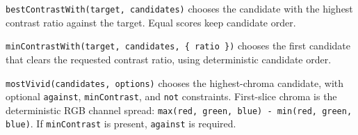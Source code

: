 \texttt{b\allowbreak{}e\allowbreak{}s\allowbreak{}t\allowbreak{}C\allowbreak{}o\allowbreak{}n\allowbreak{}t\allowbreak{}r\allowbreak{}a\allowbreak{}s\allowbreak{}t\allowbreak{}W\allowbreak{}i\allowbreak{}t\allowbreak{}h\allowbreak{}(\allowbreak{}t\allowbreak{}a\allowbreak{}r\allowbreak{}g\allowbreak{}e\allowbreak{}t\allowbreak{},\allowbreak{} \allowbreak{}c\allowbreak{}a\allowbreak{}n\allowbreak{}d\allowbreak{}i\allowbreak{}d\allowbreak{}a\allowbreak{}t\allowbreak{}e\allowbreak{}s\allowbreak{})} chooses the candidate with the highest contrast ratio against the target. Equal scores keep candidate order.

\texttt{m\allowbreak{}i\allowbreak{}n\allowbreak{}C\allowbreak{}o\allowbreak{}n\allowbreak{}t\allowbreak{}r\allowbreak{}a\allowbreak{}s\allowbreak{}t\allowbreak{}W\allowbreak{}i\allowbreak{}t\allowbreak{}h\allowbreak{}(\allowbreak{}t\allowbreak{}a\allowbreak{}r\allowbreak{}g\allowbreak{}e\allowbreak{}t\allowbreak{},\allowbreak{} \allowbreak{}c\allowbreak{}a\allowbreak{}n\allowbreak{}d\allowbreak{}i\allowbreak{}d\allowbreak{}a\allowbreak{}t\allowbreak{}e\allowbreak{}s\allowbreak{},\allowbreak{} \allowbreak{}\{\allowbreak{} \allowbreak{}r\allowbreak{}a\allowbreak{}t\allowbreak{}i\allowbreak{}o\allowbreak{} \allowbreak{}\}\allowbreak{})} chooses the first candidate that clears the requested contrast ratio, using deterministic candidate order.

\texttt{m\allowbreak{}o\allowbreak{}s\allowbreak{}t\allowbreak{}V\allowbreak{}i\allowbreak{}v\allowbreak{}i\allowbreak{}d\allowbreak{}(\allowbreak{}c\allowbreak{}a\allowbreak{}n\allowbreak{}d\allowbreak{}i\allowbreak{}d\allowbreak{}a\allowbreak{}t\allowbreak{}e\allowbreak{}s\allowbreak{},\allowbreak{} \allowbreak{}o\allowbreak{}p\allowbreak{}t\allowbreak{}i\allowbreak{}o\allowbreak{}n\allowbreak{}s\allowbreak{})} chooses the highest-chroma candidate, with optional \texttt{a\allowbreak{}g\allowbreak{}a\allowbreak{}i\allowbreak{}n\allowbreak{}s\allowbreak{}t}, \texttt{m\allowbreak{}i\allowbreak{}n\allowbreak{}C\allowbreak{}o\allowbreak{}n\allowbreak{}t\allowbreak{}r\allowbreak{}a\allowbreak{}s\allowbreak{}t}, and \texttt{n\allowbreak{}o\allowbreak{}t} constraints. First-slice chroma is the deterministic RGB channel spread: \texttt{m\allowbreak{}a\allowbreak{}x\allowbreak{}(\allowbreak{}r\allowbreak{}e\allowbreak{}d\allowbreak{},\allowbreak{} \allowbreak{}g\allowbreak{}r\allowbreak{}e\allowbreak{}e\allowbreak{}n\allowbreak{},\allowbreak{} \allowbreak{}b\allowbreak{}l\allowbreak{}u\allowbreak{}e\allowbreak{})\allowbreak{} \allowbreak{}-\allowbreak{} \allowbreak{}m\allowbreak{}i\allowbreak{}n\allowbreak{}(\allowbreak{}r\allowbreak{}e\allowbreak{}d\allowbreak{},\allowbreak{} \allowbreak{}g\allowbreak{}r\allowbreak{}e\allowbreak{}e\allowbreak{}n\allowbreak{},\allowbreak{} \allowbreak{}b\allowbreak{}l\allowbreak{}u\allowbreak{}e\allowbreak{})}. If \texttt{m\allowbreak{}i\allowbreak{}n\allowbreak{}C\allowbreak{}o\allowbreak{}n\allowbreak{}t\allowbreak{}r\allowbreak{}a\allowbreak{}s\allowbreak{}t} is present, \texttt{a\allowbreak{}g\allowbreak{}a\allowbreak{}i\allowbreak{}n\allowbreak{}s\allowbreak{}t} is required.

